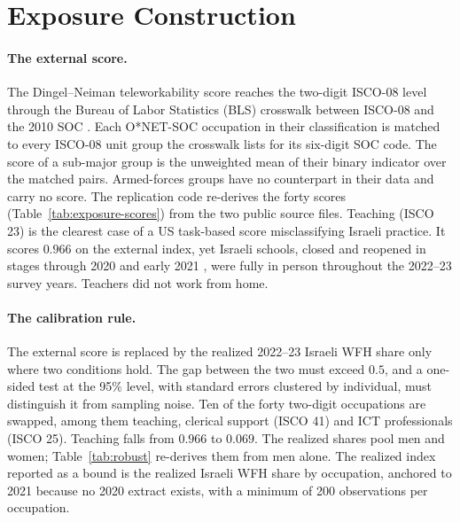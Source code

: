 \section{Exposure Construction}\label{sec:appendix-exposure}

\paragraph{The external score.}
The Dingel--Neiman teleworkability score \citep{dingel2020} reaches the two-digit ISCO-08 level
through the Bureau of Labor Statistics (BLS) crosswalk between ISCO-08 and the 2010 SOC
\citep{bls2012crosswalk}. Each
O*NET-SOC occupation in their classification is matched to every ISCO-08 unit group the
crosswalk lists for its six-digit SOC code. The score of a sub-major group is the unweighted
mean of their binary indicator over the matched pairs. Armed-forces groups have no counterpart
in their data and carry no score. The replication code re-derives the forty scores
(Table~\ref{tab:exposure-scores}) from the two public source files. Teaching (ISCO 23) is the
clearest case of a US task-based score misclassifying Israeli practice. It scores $0.966$ on
the external index, yet Israeli schools, closed and reopened in stages through 2020 and early
2021 \citep{somekh2021, hale2021}, were fully in person throughout the 2022--23 survey years.
Teachers did not work from home.

\paragraph{The calibration rule.}
The external score is replaced by the realized 2022--23 Israeli WFH share only where two
conditions hold. The gap between the two must exceed $0.5$, and a one-sided test at the 95\%
level, with standard errors clustered by individual, must distinguish it from sampling noise.
Ten of the forty two-digit occupations are swapped, among them teaching, clerical support
(ISCO 41) and ICT professionals (ISCO 25). Teaching falls from $0.966$ to $0.069$. The realized
shares pool men and women; Table~\ref{tab:robust} re-derives them from men alone. The realized
index reported as a bound is the realized Israeli WFH share by occupation, anchored to 2021
because no 2020 extract exists, with a minimum of 200 observations per occupation.

